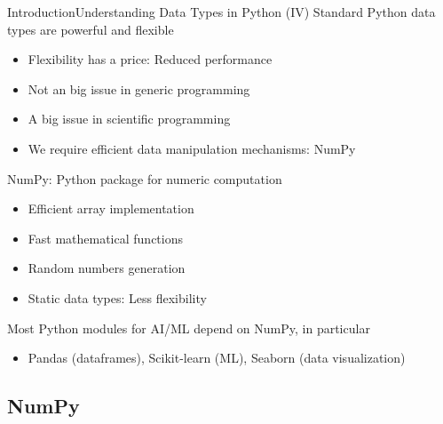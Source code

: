 \documentclass[10pt,compress]{beamer} %
\begin{document}
\begin{frame}[fragile]{Introduction}{Understanding Data Types in Python (IV)}
	Standard Python data types are powerful and flexible
	\begin{itemize}
		\item Flexibility has a price: Reduced performance
		\item Not an big issue in generic programming
		\item A big issue in scientific programming
		\item We require efficient data manipulation mechanisms: NumPy
	\end{itemize}
	NumPy: Python package for numeric computation
	\begin{itemize}
		\item Efficient array implementation
		\item Fast mathematical functions
		\item Random numbers generation
		\item Static data types: Less flexibility
	\end{itemize}
	Most Python modules for AI/ML depend on NumPy, in particular
	\begin{itemize}
		\item Pandas (dataframes), Scikit-learn (ML), Seaborn (data visualization)
	\end{itemize}
\end{frame}

\subsection{NumPy}
\end{document}
